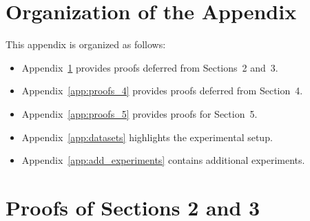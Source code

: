 \documentclass{uai2026} %
\newcommand{\1}{\mathbf{1}}
\begin{document}
\section*{Organization of the Appendix}
This appendix is organized as follows:
\begin{itemize}
  \item Appendix~\ref{app:proofs_2_3} provides proofs deferred from Sections~2 and~3.
  \item Appendix~\ref{app:proofs_4} provides proofs deferred from Section~4.
  \item Appendix~\ref{app:proofs_5} provides proofs for Section~5.
  \item Appendix~\ref{app:datasets} highlights the experimental setup.
  \item Appendix~\ref{app:add_experiments} contains additional experiments.
\end{itemize}

\section{Proofs of Sections 2 and 3}
\label{app:proofs_2_3}
\end{document}

